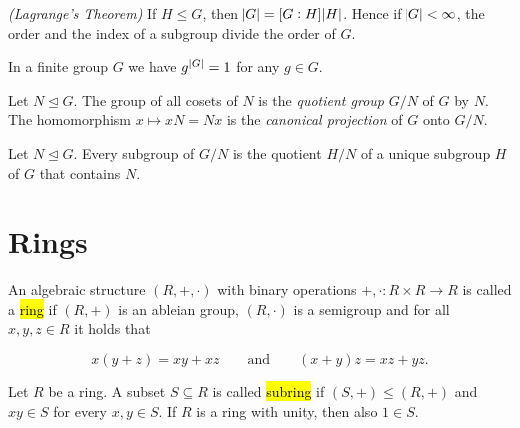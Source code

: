 \vspace{2mm}

\begin{proposition}\emph{(Lagrange's Theorem)}
	If $H \leq G$, then $\abs{G} = \intcc{G : H}\abs{H}$. Hence if $\abs{G} < \infty$, the order and the index of a subgroup divide the order of $G$.
\end{proposition}

\vspace{2mm}

\begin{theorem}
	In a finite group $G$ we have $g^{\abs[0]{G}} = 1$ for any $g \in G$.
\end{theorem}

\vspace{2mm}

\begin{definition}
	Let $N \unlhd G$. The group of all cosets of $N$ is the \emph{quotient group} $G/N$ of $G$ by $N$. The homomorphism $x \mapsto xN = Nx$ is the \emph{canonical projection} of $G$ onto $G/N$.
\end{definition}

\vspace{2mm}

\begin{proposition}
	Let $N \unlhd G$. Every subgroup of $G/N$ is the quotient $H/N$ of a unique subgroup $H$ of $G$ that contains $N$.
\end{proposition}

\vspace{2mm}

\newpage
\section{Rings}

\begin{definition}
	An algebraic structure $(R,+,\cdot)$ with binary operations $+,\cdot: R \times R \to R$ is called a \hl{ring} if $(R,+)$ is an ableian group, $(R,\cdot)$ is a semigroup and for all $x,y,z \in R$ it holds that

	\begin{equation*}
		x(y + z) = xy + xz \qquad \text{and} \qquad (x + y)z = xz + yz.
	\end{equation*}
\end{definition}

\vspace{1mm}

\begin{definition}
	Let $R$ be a ring. A subset $S \subseteq R$ is called \hl{subring} if $(S,+) \leq (R,+)$ and $xy \in S$ for every $x,y \in S$. If $R$ is a ring with unity, then also $1 \in S$.
\end{definition}

